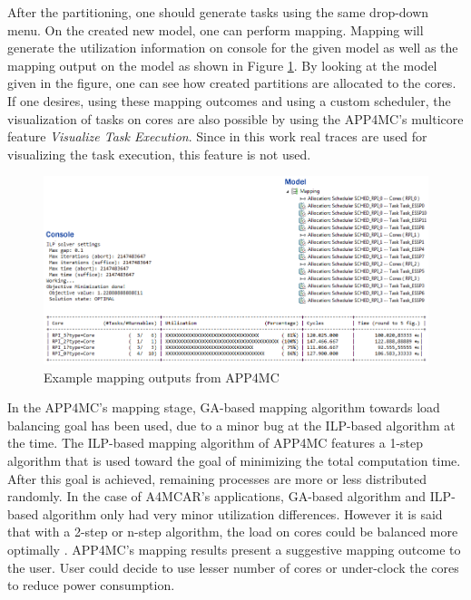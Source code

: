 After the partitioning, one should generate tasks using the same drop-down menu. On the created new model, one can perform mapping. Mapping will generate the utilization information on console for the given model as well as the mapping output on the model as shown in Figure \ref{fig:mappings}. By looking at the model given in the figure, one can see how created partitions are allocated to the cores. If one desires, using these mapping outcomes and using a custom scheduler, the visualization of tasks on cores are also possible by using the APP4MC's multicore feature \textit{Visualize Task Execution}. Since in this work real traces are used for visualizing the task execution, this feature is not used.

\begin{figure}[!ht]
	\centering
	\captionsetup{justification=centering}
	\includegraphics[width=\textwidth]{content/images/mappings.png}
	\caption{Example mapping outputs from APP4MC}
	\label{fig:mappings}
\end{figure}

In the APP4MC's mapping stage, GA-based mapping algorithm towards load balancing goal has been used, due to a minor bug at the ILP-based algorithm at the time. The ILP-based mapping algorithm of APP4MC features a 1-step algorithm that is used toward the goal of minimizing the total computation time. After this goal is achieved, remaining processes are more or less distributed randomly. In the case of A4MCAR's applications, GA-based algorithm and ILP-based algorithm only had very minor utilization differences. However it is said that with a 2-step or n-step algorithm, the load on cores could be balanced more optimally \cite{mappingbook}. APP4MC's mapping results present a suggestive mapping outcome to the user. User could decide to use lesser number of cores or under-clock the cores to reduce power consumption.


